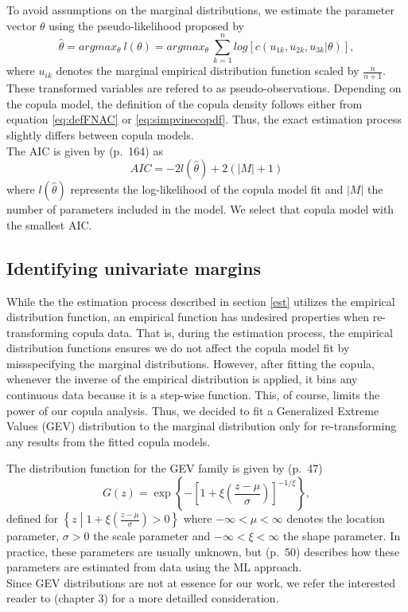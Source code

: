 \documentclass[
]{krantz}
\begin{document}
To avoid assumptions on the marginal distributions,
we estimate the parameter vector \(\theta\) using the pseudo-likelihood proposed by \citet{genest1995}
\[
\hat{\theta} = argmax_\theta\ l(\theta) = argmax_\theta\ \sum_{k = 1}^{n}log[c(u_{1k}, u_{2k}, u_{3k}|\theta)],
\label{eq:pseudologlik}
\]
where \(u_{ik}\) denotes the marginal empirical distribution function scaled by \(\frac{n}{n+1}\).
These transformed variables are refered to as pseudo-observations.
Depending on the copula model, the definition of the copula density follows either from
equation \eqref{eq:defFNAC} or \eqref{eq:simpvinecopdf}.
Thus, the exact estimation process slightly differs between copula models.\\
The AIC is given by \citet{fahrmeir2013} (p.~164) as
\[
AIC = -2 l(\hat{\theta}) + 2 (|M| + 1)
\label{eq:AIC}
\]
where \(l(\hat{\theta})\) represents the log-likelihood of the copula model fit and \(|M|\) the number of parameters included in the model.
We select that copula model with the smallest AIC.

\subsection{Identifying univariate margins}\label{gev}

While the the estimation process described in section \ref{est} utilizes the
empirical distribution function, an empirical function has undesired properties when re-transforming copula data.
That is, during the estimation process, the empirical distribution functions ensures we
do not affect the copula model fit by missspecifying the marginal distributions.
However, after fitting the copula, whenever the inverse of the empirical distribution is applied, it bins any continuous data because it is a step-wise function. This, of course, limits the power of our copula analysis.
Thus, we decided to fit a Generalized Extreme Values (GEV) distribution to the marginal distribution only for re-transforming any results from the fitted copula models.

The distribution function for the GEV family is given by \citet{coles2001} (p.~47)
\[
G(z) = \exp\left\{ -\left[ 1 + \xi \left( \frac{z - \mu}{\sigma} \right) \right]^{-1/\xi} \right\},
\]
defined for \(\left\{ z \middle| 1 + \xi \left(\frac{z - \mu}{\sigma}\right) > 0 \right\}\) where
\(-\infty < \mu < \infty\) denotes the location parameter,
\(\sigma > 0\) the scale parameter and
\(-\infty < \xi < \infty\) the shape parameter.
In practice, these parameters are usually unknown, but \citet{coles2001} (p.~50) describes how these parameters are estimated from data using the ML approach.\\
Since GEV distributions are not at essence for our work, we refer the interested reader to \citet{coles2001} (chapter 3)
for a more detailled consideration.
\end{document}
